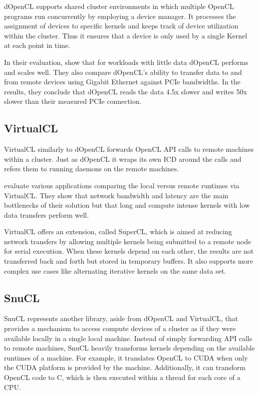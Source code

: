 dOpenCL supports shared cluster environments in which multiple OpenCL programs run concurrently by employing a device manager. It processes the assignment of devices to specific kernels and keeps track of device utilization within the cluster. Thus it ensures that a device is only used by a single Kernel at each point in time.

In their evaluation, \citeauthor{dopencl} show that for workloads with little data dOpenCL performs and scales well. They also compare dOpenCL's ability to transfer data to and from remote devices using Gigabit Ethernet against PCIe bandwidths. In the results, they conclude that dOpenCL reads the data 4.5x slower and writes 50x slower than their measured PCIe connection.

\subsection*{VirtualCL}

VirtualCL similarly to dOpenCL forwards OpenCL API calls to remote machines within a cluster\cite{virtualcl}. Just as dOpenCL it wraps its own ICD around the calls and refers them to running daemons on the remote machines.

\citeauthor{virtualcl} evaluate various applications comparing the local versus remote runtimes via VirtualCL. They show that network bandwidth and latency are the main bottlenecks of their solution but that long and compute intense kernels with low data transfers perform well.

VirtualCL offers an extension, called SuperCL, which is aimed at reducing network transfers by allowing multiple kernels being submitted to a remote node for serial execution. When these kernels depend on each other, the results are not transferred back and forth but stored in temporary buffers. It also supports more complex use cases like alternating iterative kernels on the same data set.

\subsection*{SnuCL}

SnuCL represents another library, aside from dOpenCL and VirtualCL, that provides a mechanism to access compute devices of a cluster as if they were available locally in a single local machine\cite{snucl}. Instead of simply forwarding API calls to remote machines, SnuCL heavily transforms kernels depending on the available runtimes of a machine. For example, it translates OpenCL to CUDA when only the CUDA platform is provided by the machine. Additionally, it can transform OpenCL code to C, which is then executed within a thread for each core of a CPU.

